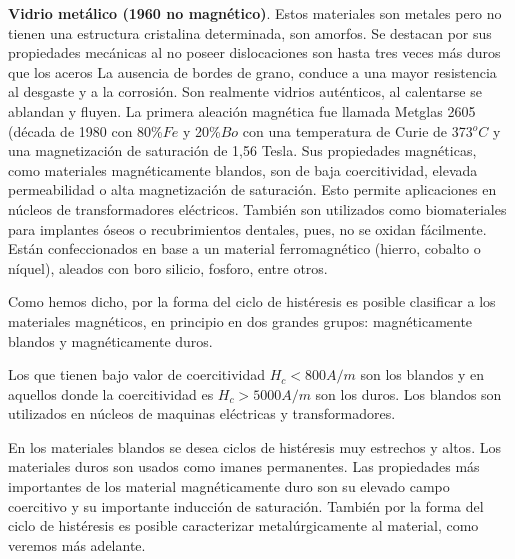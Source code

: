 \textbf{Vidrio metálico (1960 no magnético)}. Estos materiales son metales pero no tienen una estructura cristalina determinada, son amorfos. Se destacan por sus propiedades mecánicas al no poseer dislocaciones son hasta tres veces más duros que los aceros La ausencia de bordes de grano, conduce a una mayor resistencia al desgaste y a la corrosión. Son realmente vidrios auténticos, al calentarse se ablandan y fluyen. La primera aleación magnética fue llamada Metglas 2605 (década de 1980 con 80\%$Fe$ y 20\%$Bo$ con una temperatura de Curie de 373${^{o}C}$ y una magnetización de saturación de 1,56 Tesla. Sus propiedades magnéticas, como materiales magnéticamente blandos, son de baja coercitividad, elevada permeabilidad o alta magnetización de saturación. Esto permite aplicaciones en núcleos de transformadores eléctricos. También son utilizados como biomateriales para implantes óseos o recubrimientos dentales, pues, no se oxidan fácilmente. Están confeccionados en base a un material ferromagnético (hierro, cobalto o níquel), aleados con boro silicio, fosforo, entre otros.


Como hemos dicho, por la forma del ciclo de histéresis es posible clasificar a los materiales magnéticos, en principio en dos grandes grupos: magnéticamente blandos y magnéticamente duros.

Los que tienen bajo valor de coercitividad $H_{c}<800 A/m$ son los blandos y en aquellos donde la coercitividad es $H_{c} > 5000 A/m$ son los duros. Los blandos son utilizados en núcleos de maquinas eléctricas y transformadores. 

En los materiales blandos se desea ciclos de histéresis muy estrechos y altos. Los materiales duros son usados como imanes permanentes. Las propiedades más importantes de los material magnéticamente duro son su elevado campo coercitivo y su importante inducción de saturación. También por la forma del ciclo de histéresis es posible caracterizar metalúrgicamente al material, como veremos más adelante.

